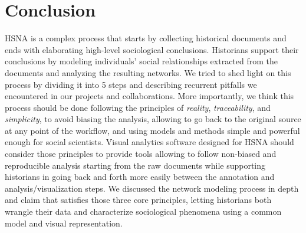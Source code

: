 


\section{Conclusion}

HSNA is a complex process that starts by collecting historical documents and ends with elaborating high-level sociological conclusions.
Historians support their conclusions by modeling individuals' social relationships extracted from the documents and analyzing the resulting networks.
We tried to shed light on this process by dividing it into 5 steps and describing recurrent pitfalls we encountered in our projects and collaborations.
More importantly, we think this process should be done following the principles of \textit{reality}, \textit{traceability}, and \textit{simplicity}, to avoid biasing the analysis, allowing to go back to the original source at any point of the workflow, and using models and methods simple and powerful enough for social scientists.
Visual analytics software designed for HSNA should consider those principles to provide tools allowing to follow non-biased and reproducible analysis starting from the raw documents while supporting historians in going back and forth more easily between the annotation and analysis/visualization steps.
We discussed the network modeling process in depth and claim that \modelplural satisfies those three core principles, letting historians both wrangle their data and characterize sociological phenomena using a common model and visual representation.
